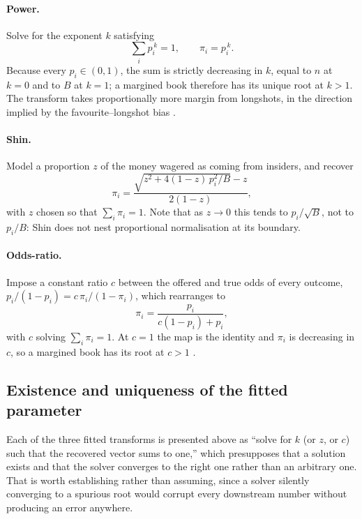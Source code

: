 \documentclass[11pt,a4paper]{article}
\begin{document}
\paragraph{Power.} Solve for the exponent $k$ satisfying
\begin{equation}
  \sum_i p_i^{\,k} = 1, \qquad \pi_i = p_i^{\,k}.
\end{equation}
Because every $p_i \in (0,1)$, the sum is strictly decreasing in $k$, equal to
$n$ at $k = 0$ and to $B$ at $k = 1$; a margined book therefore has its unique
root at $k > 1$. The transform takes proportionally more margin from longshots,
in the direction implied by the favourite--longshot bias
\citep{clarke2017}.

\paragraph{Shin.} Model a proportion $z$ of the money wagered as coming from
insiders, and recover \citep{shin1993}
\begin{equation}
  \pi_i = \frac{\sqrt{z^2 + 4(1-z)\,p_i^2 / B} - z}{2(1-z)},
  \label{eq:shin}
\end{equation}
with $z$ chosen so that $\sum_i \pi_i = 1$. Note that as $z \to 0$ this tends
to $p_i / \sqrt{B}$, not to $p_i / B$: Shin does not nest proportional
normalisation at its boundary.

\paragraph{Odds-ratio.} Impose a constant ratio $c$ between the offered and
true odds of every outcome, $p_i/(1-p_i) = c\,\pi_i/(1-\pi_i)$, which rearranges
to
\begin{equation}
  \pi_i = \frac{p_i}{c(1-p_i) + p_i},
\end{equation}
with $c$ solving $\sum_i \pi_i = 1$. At $c = 1$ the map is the identity and
$\pi_i$ is decreasing in $c$, so a margined book has its root at $c > 1$
\citep{cheung2015}.

\subsection{Existence and uniqueness of the fitted parameter}
\label{sec:existence}

Each of the three fitted transforms is presented above as ``solve for $k$
(or $z$, or $c$) such that the recovered vector sums to one,'' which
presupposes that a solution exists and that the solver converges to the
right one rather than an arbitrary one. That is worth establishing rather
than assuming, since a solver silently converging to a spurious root would
corrupt every downstream number without producing an error anywhere.
\end{document}
